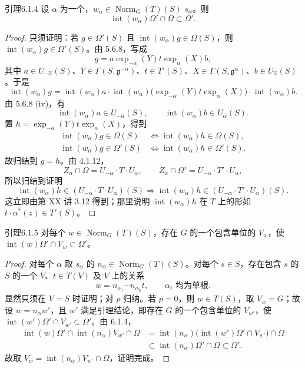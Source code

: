 \begin{SGAresult}{引理}{6.1.4}
设 $\alpha$ 为一个，$w_\alpha\in\operatorname{Norm}_G(T)(S)$  $s_\alpha$。则
\[\operatorname{int}(w_\alpha)\Omega'\cap\Omega\subset\Omega'.\]
\end{SGAresult}
\begin{proof}
只须证明：若 $g\in\Omega'(S)$ 且 $\operatorname{int}(w_\alpha)g\in\Omega(S)$，则 $\operatorname{int}(w_\alpha)g\in\Omega'(S)$。由 5.6.8，写成
\[g=a\exp_{-\alpha}(Y)t\exp_\alpha(X)b,\]
其中 $a\in U_{-\widehat\alpha}(S)$、$Y\in\Gamma(S,\mathfrak g^{-\alpha})$、$t\in T'(S)$、$X\in\Gamma(S,\mathfrak g^\alpha)$、$b\in U_{\widehat\alpha}(S)$。于是
\[\operatorname{int}(w_\alpha)g=\operatorname{int}(w_\alpha)a\cdot
\operatorname{int}(w_\alpha)\bigl(\exp_{-\alpha}(Y)t\exp_\alpha(X)\bigr)\cdot\operatorname{int}(w_\alpha)b.\]
由 5.6.8 (iv)，有
\[\operatorname{int}(w_\alpha)a\in U_{-\widehat\alpha}(S),\qquad
\operatorname{int}(w_\alpha)b\in U_{\widehat\alpha}(S).\]
置 $h=\exp_{-\alpha}(Y)t\exp_\alpha(X)$，得到
\[\begin{aligned}
\operatorname{int}(w_\alpha)g\in\Omega(S)&\Longleftrightarrow\operatorname{int}(w_\alpha)h\in\Omega(S),\\
\operatorname{int}(w_\alpha)g\in\Omega'(S)&\Longleftrightarrow\operatorname{int}(w_\alpha)h\in\Omega'(S).
\end{aligned}\]
故归结到 $g=h$。由 4.1.12，
\[Z_\alpha\cap\Omega=U_{-\alpha}\cdot T\cdot U_\alpha,\qquad
Z_\alpha\cap\Omega'=U_{-\alpha}\cdot T'\cdot U_\alpha,\]
所以归结到证明
\[\operatorname{int}(w_\alpha)h\in(U_{-\alpha}\cdot T\cdot U_\alpha)(S)
\Longrightarrow\operatorname{int}(w_\alpha)h\in(U_{-\alpha}\cdot T'\cdot U_\alpha)(S).\]
这立即由第 XX 讲 3.12 得到；那里说明 $\operatorname{int}(w_\alpha)h$ 在 $T$ 上的形如 $t\cdot\alpha^*(z)\in T'(S)$。
\end{proof}
\begin{SGAresult}{引理}{6.1.5}
对每个 $w\in\operatorname{Norm}_G(T)(S)$，存在 $G$ 的一个包含单位的 $V_w$，使 $\operatorname{int}(w)\Omega'\cap V_w\subset\Omega'$。
\end{SGAresult}
\begin{proof}
对每个 $\alpha$ 取 $s_\alpha$ 的 $n_\alpha\in\operatorname{Norm}_G(T)(S)$。对每个 $s\in S$，存在包含 $s$ 的 $S$ 的一个 $V$、$t\in T(V)$ 及 $V$ 上的关系
\[w=n_{\alpha_1}\cdots n_{\alpha_p}t,\qquad\alpha_i\text{ 均为单根}.\]
显然只须在 $V=S$ 时证明；对 $p$ 归纳。若 $p=0$，则 $w\in T(S)$，取 $V_w=G$；故设 $w=n_\alpha w'$，且 $w'$ 满足引理结论，即存在 $G$ 的一个包含单位的 $V_{w'}$，使 $\operatorname{int}(w')\Omega'\cap V_{w'}\subset\Omega'$。由 6.1.4，
\[\begin{split}
\operatorname{int}(w)\Omega'\cap\operatorname{int}(n_\alpha)V_{w'}\cap\Omega
&=\operatorname{int}(n_\alpha)\bigl(\operatorname{int}(w')\Omega'\cap V_{w'}\bigr)\cap\Omega\\
&\subset\operatorname{int}(n_\alpha)\Omega'\cap\Omega\subset\Omega'.
\end{split}\]
故取 $V_w=\operatorname{int}(n_\alpha)V_{w'}\cap\Omega$，证明完成。
\end{proof}
